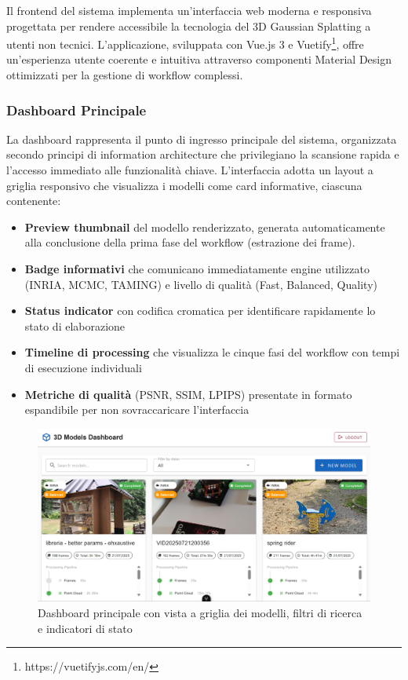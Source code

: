 Il frontend del sistema implementa un'interfaccia web moderna e responsiva progettata per rendere accessibile la tecnologia del 3D Gaussian Splatting a utenti non tecnici. L'applicazione, sviluppata con Vue.js 3 e Vuetify\footnote{https://vuetifyjs.com/en/}, offre un'esperienza utente coerente e intuitiva attraverso componenti Material Design ottimizzati per la gestione di workflow complessi.

\subsubsection{Dashboard Principale}

La dashboard rappresenta il punto di ingresso principale del sistema, organizzata secondo principi di information architecture che privilegiano la scansione rapida e l'accesso immediato alle funzionalità chiave. L'interfaccia adotta un layout a griglia responsivo che visualizza i modelli come card informative, ciascuna contenente:

\begin{itemize}
	\item \textbf{Preview thumbnail} del modello renderizzato, generata automaticamente alla conclusione della prima fase del workflow (estrazione dei frame).
	\item \textbf{Badge informativi} che comunicano immediatamente engine utilizzato (INRIA, MCMC, TAMING) e livello di qualità (Fast, Balanced, Quality)
	\item \textbf{Status indicator} con codifica cromatica per identificare rapidamente lo stato di elaborazione
	\item \textbf{Timeline di processing} che visualizza le cinque fasi del workflow con tempi di esecuzione individuali
	\item \textbf{Metriche di qualità} (PSNR, SSIM, LPIPS) presentate in formato espandibile per non sovraccaricare l'interfaccia
\end{itemize}

\begin{figure}[htbp]
	\centering
	\includegraphics[width=\textwidth]{images/fronted_list.jpg}
	\caption{Dashboard principale con vista a griglia dei modelli, filtri di ricerca e indicatori di stato}
	\label{fig:dashboard_main}
\end{figure}


